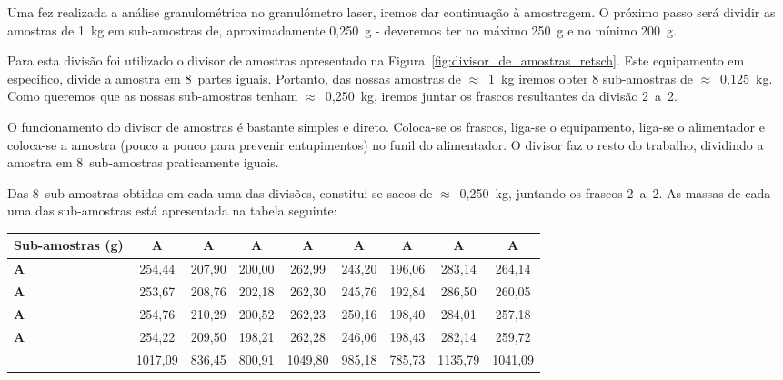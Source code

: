 Uma fez realizada a análise granulométrica no granulómetro laser, iremos dar continuação à amostragem.
O próximo passo será dividir as amostras de 1~kg em sub-amostras de, aproximadamente 0,250~g - deveremos ter no máximo 250~g e no mínimo 200~g.

Para esta divisão foi utilizado o divisor de amostras apresentado na Figura~\ref{fig:divisor_de_amostras_retsch}.
Este equipamento em específico, divide a amostra em 8~partes iguais.
Portanto, das nossas amostras de $\approx$~1~kg iremos obter 8 sub-amostras de $\approx$~0,125~kg.
Como queremos que as nossas sub-amostras tenham $\approx$~0,250~kg, iremos juntar os frascos resultantes da divisão 2~a~2.

O funcionamento do divisor de amostras é bastante simples e direto.
Coloca-se os frascos, liga-se o equipamento, liga-se o alimentador e coloca-se a amostra (pouco a pouco para prevenir entupimentos) no funil do alimentador.
O divisor faz o resto do trabalho, dividindo a amostra em 8~sub-amostras praticamente iguais.

Das 8~sub-amostras obtidas em cada uma das divisões, constitui-se sacos de $\approx$~0,250~kg, juntando os frascos 2~a~2.
As massas de cada uma das sub-amostras está apresentada na tabela seguinte:

\begin{table}[ht]
\centering
    \begin{tabularx}{\textwidth}{@{}lCCCCCCCC@{}}
        \toprule
        \textbf{Sub-amostras (g)} & \textbf{A} & \textbf{A} & \textbf{A} & \textbf{A} & \textbf{A} & \textbf{A} & \textbf{A} & \textbf{A} \\ \hline
        \textbf{A} & 254,44 & 207,90 & 200,00 & 262,99 & 243,20 & 196,06 & 283,14 & 264,14 \\
        \textbf{A} & 253,67 & 208,76 & 202,18 & 262,30 & 245,76 & 192,84 & 286,50 & 260,05 \\
        \textbf{A} & 254,76 & 210,29 & 200,52 & 262,23 & 250,16 & 198,40 & 284,01 & 257,18 \\
        \textbf{A} & 254,22 & 209,50 & 198,21 & 262,28 & 246,06 & 198,43 & 282,14 & 259,72 \\ \midrule
        \textbf{\bm{$\sum$}} & 1017,09 & 836,45 & 800,91 & 1049,80 & 985,18 & 785,73 & 1135,79 & 1041,09 \\ \bottomrule
    \end{tabularx}
\end{table}


